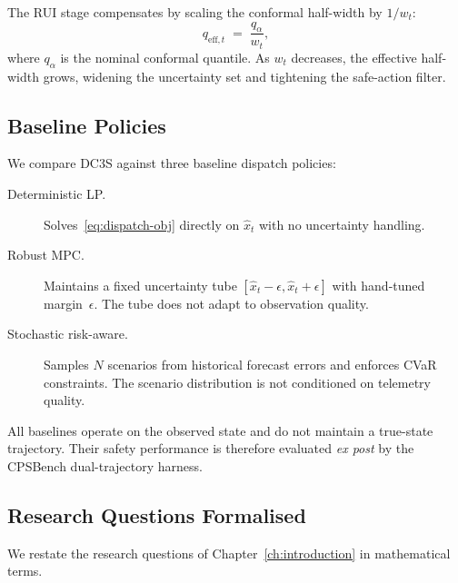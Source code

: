 The RUI stage compensates by scaling the conformal half-width by
$1/w_t$:
\begin{equation}
\label{eq:rui-inflation}
  q_{\mathrm{eff},t} \;=\; \frac{q_{\alpha}}{w_t},
\end{equation}
where $q_{\alpha}$ is the nominal conformal quantile.  As $w_t$
decreases, the effective half-width grows, widening the uncertainty set
and tightening the safe-action filter.

\subsection{Baseline Policies}
\label{sec:baselines}

We compare DC3S against three baseline dispatch policies:

\begin{description}
  \item[Deterministic LP.]  Solves~\eqref{eq:dispatch-obj} directly on
    $\hat{x}_t$ with no uncertainty handling.
  \item[Robust MPC.]  Maintains a fixed uncertainty tube
    $[\hat{x}_t - \epsilon, \hat{x}_t + \epsilon]$ with hand-tuned
    margin~$\epsilon$.  The tube does not adapt to observation quality.
  \item[Stochastic risk-aware.]  Samples $N$ scenarios from historical
    forecast errors and enforces CVaR constraints.  The scenario
    distribution is not conditioned on telemetry quality.
\end{description}

All baselines operate on the observed state and do not maintain a
true-state trajectory.  Their safety performance is therefore evaluated
\emph{ex post} by the CPSBench dual-trajectory harness.

\subsection{Research Questions Formalised}
\label{sec:rqs-formal}

We restate the research questions of Chapter~\ref{ch:introduction} in
mathematical terms.

